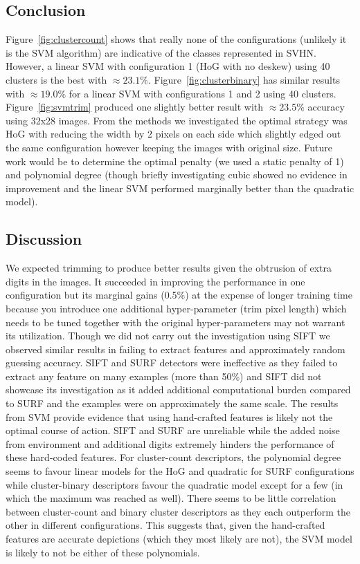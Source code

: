 \documentclass{article} %
\begin{document}
\subsection{Conclusion}
Figure~\ref{fig:clustercount} shows that really none of the configurations (unlikely it is the SVM algorithm) are indicative of the classes represented in SVHN.  However, a linear SVM with configuration 1 (HoG with no deskew) using 40 clusters is the best with $\approx 23.1\%$.  Figure~\ref{fig:clusterbinary} has similar results with $\approx 19.0\%$ for a linear SVM with configurations 1 and 2 using 40 clusters.  Figure~\ref{fig:svmtrim} produced one slightly better result with $\approx 23.5\%$ accuracy using 32x28 images. From the methods we investigated the optimal strategy was HoG with reducing the width by 2 pixels on each side which slightly edged out the same configuration however keeping the images with original size. Future work would be to determine the optimal penalty (we used a static penalty of 1) and polynomial degree (though briefly investigating cubic showed no evidence in improvement and the linear SVM performed marginally better than the quadratic model).

\subsection{Discussion}
We expected trimming to produce better results given the obtrusion of extra digits in the images. It succeeded in improving the performance in one configuration but its marginal gains (0.5\%) at the expense of longer training time because you introduce one additional hyper-parameter (trim pixel length) which needs to be tuned together with the original hyper-parameters may not warrant its utilization. Though we did not carry out the investigation using SIFT we observed similar results in failing to extract features and approximately random guessing accuracy. SIFT and SURF detectors were ineffective as they failed to extract any feature on many examples (more than 50\%) and SIFT did not showcase its investigation as it added additional computational burden compared to SURF and the examples were on approximately the same scale. The results from SVM provide evidence that using hand-crafted features is likely not the optimal course of action. SIFT and SURF are unreliable while the added noise from environment and additional digits extremely hinders the performance of these hard-coded features. For cluster-count descriptors, the polynomial degree seems to favour linear models for the HoG and quadratic for SURF configurations while cluster-binary descriptors favour the quadratic model except for a few (in which the maximum was reached as well). There seems to be little correlation between cluster-count and binary cluster descriptors as they each outperform the other in different configurations.  This suggests that, given the hand-crafted features are accurate depictions (which they most likely are not), the SVM model is likely to not be either of these polynomials.
\end{document}

